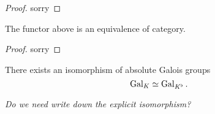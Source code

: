 \begin{proof}
    \notready

    sorry
\end{proof}

\begin{theorem}
    \label{tilting_finite_equivalence_of_category}
    \notready

    The functor above is an equivalence of category.
\end{theorem}

\begin{proof}
    \notready

    sorry
\end{proof}

\begin{definition}
    \label{Galois Isomorphism of Perfectoid Fields}

    \notready

    There exists an isomorphism of absolute Galois groups
    $$ \operatorname{Gal}_K \simeq \operatorname{Gal}_{K^\flat}.$$

    \emph{Do we need write down the explicit isomorphism?}
\end{definition}
